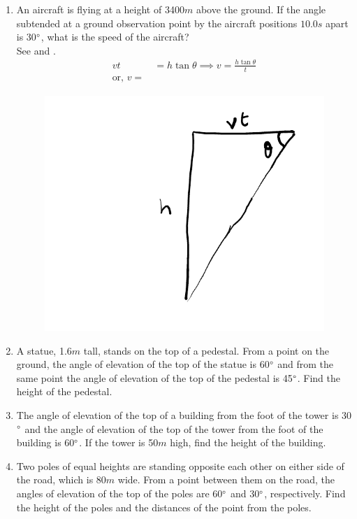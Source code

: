 \begin{enumerate}[label=\thesubsection.\arabic*.,ref=\thesubsection.\theenumi]
\item An aircraft is flying at a height of 3400$m$ above the ground. If the angle subtended at a ground observation point by the aircraft positions $10.0s$ apart is 30$\degree$, what is the speed of the aircraft?
%
	\\
	\solution
See 
and .	
\begin{align}
	vt &= h\tan\theta \implies v = \frac{h\tan\theta }{t}
	\\
	\text{or, } v = \frac{}{}
\end{align}
\begin{table}[H]
\centering

\caption{}
\label{tab:ncert-1}	
\end{table}
\begin{figure}[H]
\centering
	\includegraphics[width=0.6\columnwidth]{figs/ncert/1.pdf}
\caption{}
\label{fig:ncert-1}	
\end{figure}
\item A statue, 1.6$m$ tall, stands on the top of a pedestal. From a point on the ground, the angle of elevation of the top of the statue is 60$\degree$ and from the same point the angle of elevation of the top of the pedestal is 45$\degree$. Find the height of the pedestal.
\item The angle of elevation of the top of a building from the foot of the tower is 30$\degree$ and the angle of elevation of the top of the tower from the foot of the building is 60$\degree$. If the tower is 50$m$ high, find the height of the building.
\item Two poles of equal heights are standing opposite each other on either side of the road, which is 80$m$ wide. From a point between them on the road, the angles of elevation of the top of the poles are 60$\degree$ and 30$\degree$, respectively. Find the height of the poles and the distances of the point from the poles.

\end{enumerate}
